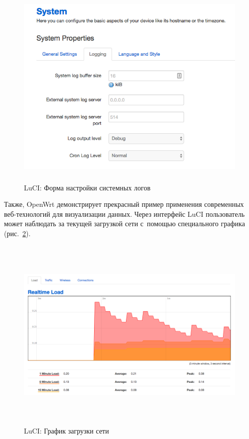 \begin{figure}[h!]
  \centering
  \includegraphics[height=10cm]{img/openwrt-logging-settings}
  \vspace*{12pt}
  \caption{LuCI: Форма настройки системных логов}\label{fig:openwrt-logging-settings}
\end{figure}

Также, OpenWrt демонстрирует прекрасный пример применения современных веб-технологий для визуализации данных. Через интерфейс LuCI пользователь может наблюдать за текущей загрузкой сети с~помощью специального графика (рис.~\ref{fig:openwrt-load-graph}).

\begin{figure}[h!]
  \centering
  \includegraphics[height=9.5cm]{img/openwrt-load-graph}
  \vspace*{0pt}
  \caption{LuCI: График загрузки сети}\label{fig:openwrt-load-graph}
\end{figure}

